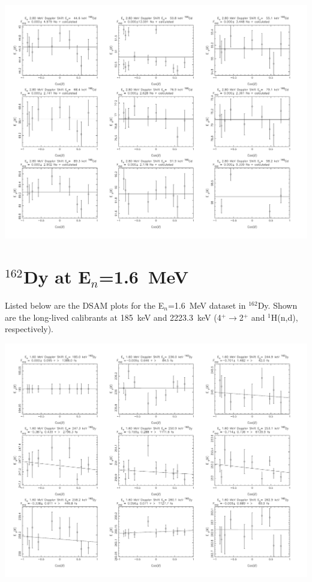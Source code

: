 \begin{center}
\includegraphics[page=25,angle=90,height=0.95\textheight]{160Gd_28ftau_HE_no.pdf}
\end{center}
\section{$^{162}$Dy at E$_n$=1.6~MeV}\label{app:DSAM_Dy_16}
Listed below are the DSAM plots for the E$_n$=1.6~MeV dataset in $^{162}$Dy. Shown are the long-lived calibrants at 185~keV and 2223.3~keV (4$^+\rightarrow$2$^+$ and $^1$H(n,d), respectively).
\begin{center}
\includegraphics[page=1,angle=90,height=0.95\textheight]{162Dy_ftau_160_n.pdf}
\end{center}

